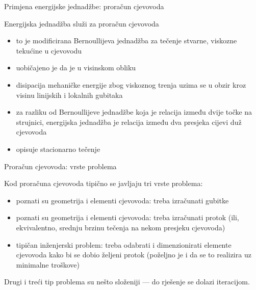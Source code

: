 \documentclass{beamer}
\begin{document}
\begin{frame}{Primjena energijske jednadžbe: proračun cjevovoda}

\begin{alertblock}{Energijska jednadžba služi za proračun cjevovoda}
\begin{itemize}
\item to je modificirana Bernoullijeva jednadžba za tečenje stvarne, viskozne
tekućine u cjevovodu
\item uobičajeno je da je u visinskom obliku
\item disipacija mehaničke energije zbog viskoznog trenja uzima se u obzir
kroz visinu linijskih i lokalnih gubitaka 
\item za razliku od Bernoullijeve jednadžbe koja je relacija između dvije
točke na strujnici, energijska jednadžba je relacija između dva presjeka
cijevi duž cjevovoda
\item opisuje stacionarno tečenje
\end{itemize}
\end{alertblock}
\end{frame}

\begin{frame}{Proračun cjevovoda: vrste problema}

Kod proračuna cjevovoda tipično se javljaju tri vrste problema:
\begin{itemize}
\item poznati su geometrija i elementi cjevovoda: treba izračunati gubitke
\item poznati su geometrija i elementi cjevovoda: treba izračunati protok
(ili, ekvivalentno, srednju brzinu tečenja na nekom presjeku cjevovoda) 
\item tipičan inženjerski problem: treba odabrati i dimenzionirati elemente
cjevovoda kako bi se dobio željeni protok (poželjno je i da se to
realizira uz minimalne troškove)
\end{itemize}
Drugi i treći tip problema su nešto složeniji --- do rješenje se
dolazi iteracijom.
\end{frame}
\end{document}
